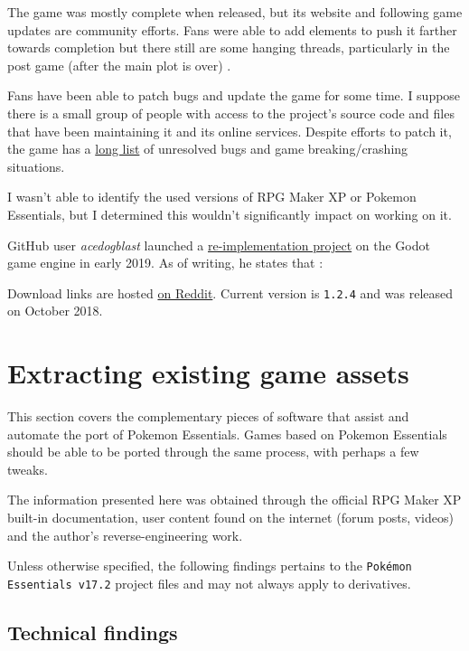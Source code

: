\documentclass[11pt]{article}
\begin{document}
The game was mostly complete when released, but its website and following game updates are community efforts. Fans were able to add elements to push it farther towards completion but there still are some hanging threads, particularly in the post game (after the main plot is over) \cite{PUsidequests}.

Fans have been able to patch bugs and update the game for some time. I suppose there is a small group of people with access to the project's source code and files that have been maintaining it and its online services. Despite efforts to patch it, the game has a \href{https://pokemon-uranium.fandom.com/wiki/Bugs_and_Errors}{long list} of unresolved bugs and game breaking/crashing situations.
	
I wasn't able to identify the used versions of RPG Maker XP or Pokemon Essentials, but I determined this wouldn't significantly impact on working on it.
	
GitHub user \textit{acedogblast} launched a \href{https://github.com/acedogblast/Project-Uranium-Godot}{re-implementation project} on the Godot game engine in early 2019. As of writing, he states that :
	
Download links are hosted \href{https://www.reddit.com/r/pokemonuranium/comments/a0cw0i/download_links/}{on Reddit}. Current version is \verb|1.2.4| and was released on October  2018.



\newpage 
\section{Extracting existing game assets}

This section covers the complementary pieces of software that assist and automate the port of Pokemon Essentials. Games based on Pokemon Essentials should be able to be ported through the same process, with perhaps a few tweaks.

The information presented here was obtained through the official RPG Maker XP built-in documentation, user content found on the internet (forum posts, videos) and the author's reverse-engineering work.

Unless otherwise specified, the following findings pertains to the \texttt{Pokémon Essentials v17.2} project files and may not always apply to derivatives. 


\subsection{Technical findings}
\end{document}
